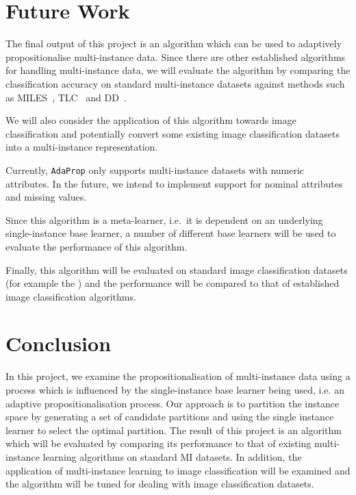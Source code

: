 \documentclass[a4paper,12pt]{article} %
\newcommand{\AdaProp}{\texttt{AdaProp}\xspace}
\begin{document}
\section{Future Work}

The final output of this project is an algorithm 
    which can be used to adaptively propositionalise multi-instance data. 
Since there are other established algorithms for handling multi-instance data, 
    we will evaluate the algorithm by comparing the classification accuracy 
    on standard multi-instance datasets against methods such as 
    MILES~\cite{Chen2006}, TLC~\cite{Weidmann2003} and DD~\cite{Maron98mil}.

We will also consider the application of this algorithm towards image classification and 
    potentially convert some existing image classification
    datasets into a multi-instance representation.

Currently, \AdaProp only supports multi-instance datasets with 
    numeric attributes.
In the future, we intend to implement support for
    nominal attributes and missing values.

Since this algorithm is a meta-learner, 
    i.e.\ it is dependent on an underlying single-instance base learner, 
    a number of different base learners will be 
    used to evaluate the performance of this algorithm.
 
Finally, this algorithm will be evaluated on 
    standard image classification datasets 
    (for example the ) and 
    the performance will be compared to that of 
    established image classification algorithms.

\section{Conclusion}
In this project, 
    we examine the propositionalisation of multi-instance data using 
    a process which is influenced by the single-instance base learner being used, 
    i.e. an adaptive propositionalisation process. 
Our approach is to partition the instance space 
    by generating a set of candidate partitions and 
    using the single instance learner to select the optimal partition. 
The result of this project is an algorithm
    which will be evaluated by comparing its performance to 
    that of existing multi-instance learning algorithms on standard MI datasets. 
In addition, 
    the application of multi-instance learning 
    to image classification will be examined and 
    the algorithm will be tuned for dealing with image classification datasets.
\clearpage
 

\end{document}
